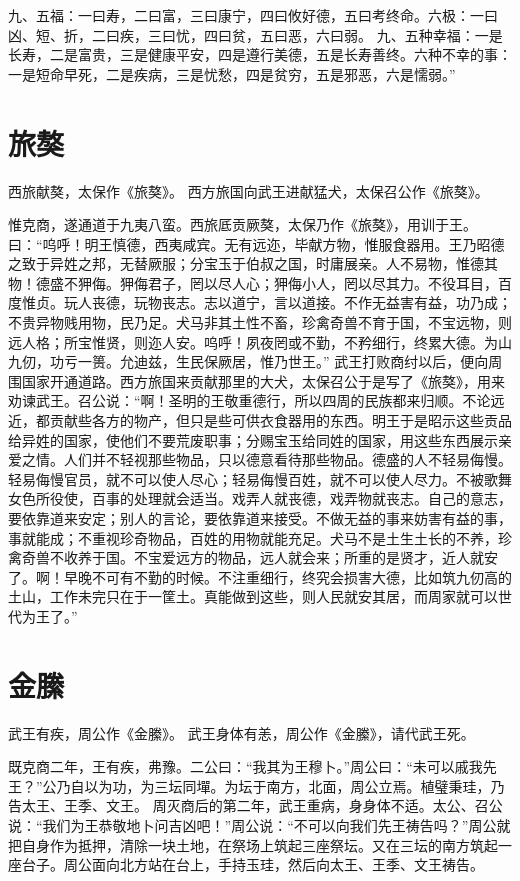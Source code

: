 \documentclass[a4paper,12pt,UTF8,twoside]{ctexbook}
\begin{document}
九、五福：一曰寿，二曰富，三曰康宁，四曰攸好德，五曰考终命。六极：一曰凶、短、折，二曰疾，三曰忧，四曰贫，五曰恶，六曰弱。
九、五种幸福：一是长寿，二是富贵，三是健康平安，四是遵行美德，五是长寿善终。六种不幸的事：一是短命早死，二是疾病，三是忧愁，四是贫穷，五是邪恶，六是懦弱。”

\chapter{旅獒}

西旅献獒，太保作《旅獒》。
西方旅国向武王进献猛犬，太保召公作《旅獒》。

惟克商，遂通道于九夷八蛮。西旅厎贡厥獒，太保乃作《旅獒》，用训于王。曰：“呜呼！明王慎德，西夷咸宾。无有远迩，毕献方物，惟服食器用。王乃昭德之致于异姓之邦，无替厥服；分宝玉于伯叔之国，时庸展亲。人不易物，惟德其物！德盛不狎侮。狎侮君子，罔以尽人心；狎侮小人，罔以尽其力。不役耳目，百度惟贞。玩人丧德，玩物丧志。志以道宁，言以道接。不作无益害有益，功乃成；不贵异物贱用物，民乃足。犬马非其土性不畜，珍禽奇兽不育于国，不宝远物，则远人格；所宝惟贤，则迩人安。呜呼！夙夜罔或不勤，不矜细行，终累大德。为山九仞，功亏一篑。允迪兹，生民保厥居，惟乃世王。”
武王打败商纣以后，便向周围国家开通道路。西方旅国来贡献那里的大犬，太保召公于是写了《旅獒》，用来劝谏武王。召公说：“啊！圣明的王敬重德行，所以四周的民族都来归顺。不论远近，都贡献些各方的物产，但只是些可供衣食器用的东西。明王于是昭示这些贡品给异姓的国家，使他们不要荒废职事；分赐宝玉给同姓的国家，用这些东西展示亲爱之情。人们并不轻视那些物品，只以德意看待那些物品。德盛的人不轻易侮慢。轻易侮慢官员，就不可以使人尽心；轻易侮慢百姓，就不可以使人尽力。不被歌舞女色所役使，百事的处理就会适当。戏弄人就丧德，戏弄物就丧志。自己的意志，要依靠道来安定；别人的言论，要依靠道来接受。不做无益的事来妨害有益的事，事就能成；不重视珍奇物品，百姓的用物就能充足。犬马不是土生土长的不养，珍禽奇兽不收养于国。不宝爱远方的物品，远人就会来；所重的是贤才，近人就安了。啊！早晚不可有不勤的时候。不注重细行，终究会损害大德，比如筑九仞高的土山，工作未完只在于一筐土。真能做到这些，则人民就安其居，而周家就可以世代为王了。”

\chapter{金縢}

武王有疾，周公作《金縢》。
武王身体有恙，周公作《金縢》，请代武王死。

既克商二年，王有疾，弗豫。二公曰：“我其为王穆卜。”周公曰：“未可以戚我先王？”公乃自以为功，为三坛同墠。为坛于南方，北面，周公立焉。植璧秉珪，乃告太王、王季、文王。
周灭商后的第二年，武王重病，身身体不适。太公、召公说：“我们为王恭敬地卜问吉凶吧！”周公说：“不可以向我们先王祷告吗？”周公就把自身作为抵押，清除一块土地，在祭场上筑起三座祭坛。又在三坛的南方筑起一座台子。周公面向北方站在台上，手持玉珪，然后向太王、王季、文王祷告。
\end{document}
